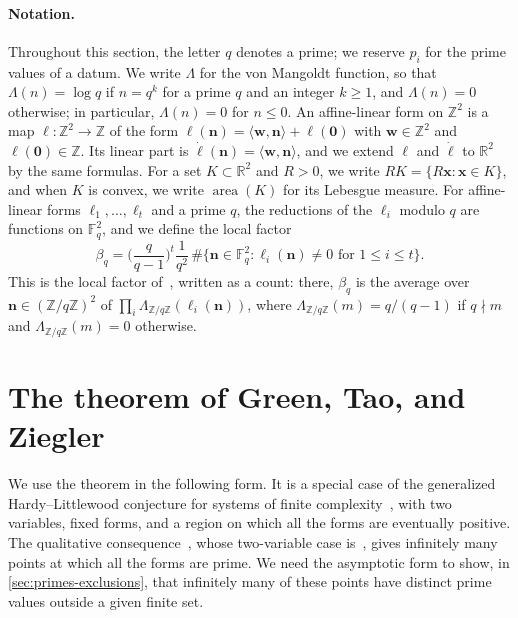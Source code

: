 \documentclass[12pt,oneside,openany]{book}
\theoremstyle{definition}
\theoremstyle{plain}
\numberwithin{equation}{chapter}
\theoremstyle{plain}
\theoremstyle{definition}
\theoremstyle{remark}
\newcommand{\Z}{\mathbb Z}
\newcommand{\F}{\mathbb F}
\newcommand{\R}{\mathbb R}
\DeclareMathOperator{\area}{area}
\begin{document}
\paragraph{Notation.} Throughout this section, the letter $q$ denotes a prime; we reserve $p_i$ for the prime values of a datum. We write $\Lambda$ for the von Mangoldt function, so that $\Lambda(n)=\log q$ if $n=q^k$ for a prime $q$ and an integer $k\ge1$, and $\Lambda(n)=0$ otherwise; in particular, $\Lambda(n)=0$ for $n\le0$. An affine-linear form on $\Z^2$ is a map $\ell\colon\Z^2\to\Z$ of the form $\ell(\mathbf n)=\langle\mathbf w,\mathbf n\rangle+\ell(\mathbf 0)$ with $\mathbf w\in\Z^2$ and $\ell(\mathbf 0)\in\Z$. Its linear part is $\dot\ell(\mathbf n)=\langle\mathbf w,\mathbf n\rangle$, and we extend $\ell$ and $\dot\ell$ to $\R^2$ by the same formulas. For a set $K\subset\R^2$ and $R>0$, we write $RK=\{R\mathbf x:\mathbf x\in K\}$, and when $K$ is convex, we write $\area(K)$ for its Lebesgue measure. For affine-linear forms $\ell_1,\dots,\ell_t$ and a prime $q$, the reductions of the $\ell_i$ modulo $q$ are functions on $\F_q^2$, and we define the local factor
\begin{equation}\label{eq:local-factor}
\beta_q=\Big(\frac q{q-1}\Big)^t\frac{1}{q^2}\,\#\big\{\mathbf n\in\F_q^2:\ell_i(\mathbf n)\ne0\text{ for }1\le i\le t\big\}.
\end{equation}
This is the local factor of~\cite[(1.6)]{GT2010}, written as a count: there, $\beta_q$ is the average over $\mathbf n\in(\Z/q\Z)^2$ of $\prod_i\Lambda_{\Z/q\Z}(\ell_i(\mathbf n))$, where $\Lambda_{\Z/q\Z}(m)=q/(q-1)$ if $q\nmid m$ and $\Lambda_{\Z/q\Z}(m)=0$ otherwise.

\section{The theorem of Green, Tao, and Ziegler}\label{sec:primes-gtz}

We use the theorem in the following form. It is a special case of the generalized Hardy--Littlewood conjecture for systems of finite complexity~\cite[Conjecture~1.2]{GT2010}, with two variables, fixed forms, and a region on which all the forms are eventually positive. The qualitative consequence~\cite[Corollary~1.9]{GT2010}, whose two-variable case is~\cite[Theorem~1.1]{HSW2014}, gives infinitely many points at which all the forms are prime. We need the asymptotic form to show, in \cref{sec:primes-exclusions}, that infinitely many of these points have distinct prime values outside a given finite set.
\end{document}
